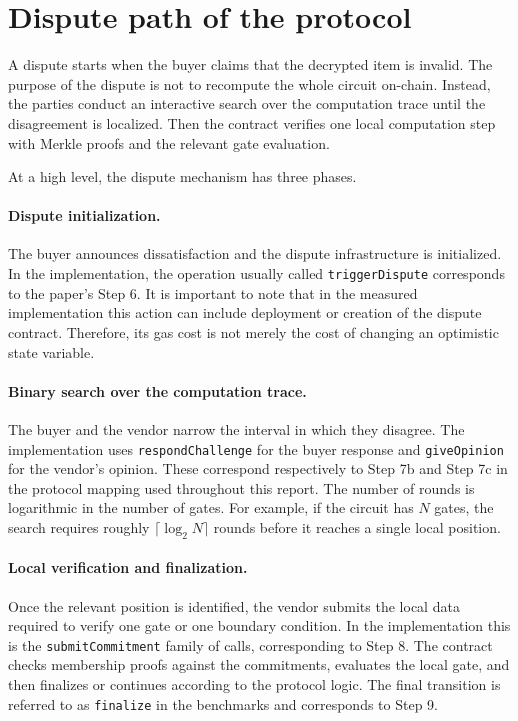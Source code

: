 \section{Dispute path of the protocol}

A dispute starts when the buyer claims that the decrypted item is invalid. The purpose of the
dispute is not to recompute the whole circuit on-chain. Instead, the parties conduct an
interactive search over the computation trace until the disagreement is localized. Then the
contract verifies one local computation step with Merkle proofs and the relevant gate
evaluation.

At a high level, the dispute mechanism has three phases.

\paragraph{Dispute initialization.}
The buyer announces dissatisfaction and the dispute infrastructure is initialized. In the
implementation, the operation usually called \texttt{triggerDispute} corresponds to the
paper's Step 6. It is important to note that in the measured implementation this action can
include deployment or creation of the dispute contract. Therefore, its gas cost is not merely
the cost of changing an optimistic state variable.

\paragraph{Binary search over the computation trace.}
The buyer and the vendor narrow the interval in which they disagree. The implementation uses
\texttt{respondChallenge} for the buyer response and \texttt{giveOpinion} for the vendor's
opinion. These correspond respectively to Step 7b and Step 7c in the protocol mapping used
throughout this report. The number of rounds is logarithmic in the number of gates. For
example, if the circuit has \(N\) gates, the search requires roughly \(\lceil \log_2 N\rceil\)
rounds before it reaches a single local position.

\paragraph{Local verification and finalization.}
Once the relevant position is identified, the vendor submits the local data required to
verify one gate or one boundary condition. In the implementation this is the
\texttt{submitCommitment} family of calls, corresponding to Step 8. The contract checks
membership proofs against the commitments, evaluates the local gate, and then finalizes or
continues according to the protocol logic. The final transition is referred to as
\texttt{finalize} in the benchmarks and corresponds to Step 9.

